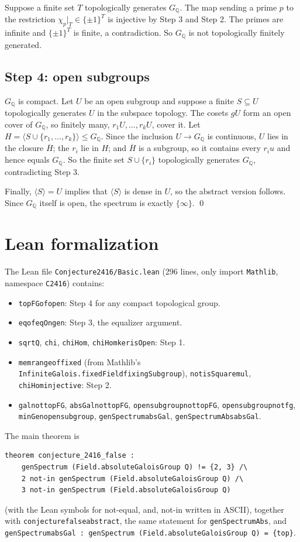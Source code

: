 \documentclass[11pt]{article}
\theoremstyle{definition}
\theoremstyle{remark}
\renewcommand{\_}{\oldus\allowbreak}
\newcommand{\GQ}{G_{\mathbb{Q}}}
\begin{document}
Suppose a finite set $T$ topologically generates $\GQ$. The map sending a prime $p$ to the restriction
$\chi_p|_T\in\{\pm1\}^T$ is injective by Step 3 and Step 2. The primes are infinite and $\{\pm1\}^T$ is finite,
a contradiction. So $\GQ$ is not topologically finitely generated.

\subsection*{Step 4: open subgroups}
$\GQ$ is compact. Let $U$ be an open subgroup and suppose a finite $S\subseteq U$ topologically generates $U$ in
the subspace topology. The cosets $gU$ form an open cover of $\GQ$, so finitely many, $r_1U,\dots,r_kU$, cover it.
Let $H=\langle S\cup\{r_1,\dots,r_k\}\rangle\le\GQ$. Since the inclusion $U\to\GQ$ is continuous, $U$ lies in the
closure $\overline H$; the $r_i$ lie in $H$; and $\overline H$ is a subgroup, so it contains every $r_iu$ and
hence equals $\GQ$. So the finite set $S\cup\{r_i\}$ topologically generates $\GQ$, contradicting Step 3.

Finally, $\langle S\rangle=U$ implies that $\langle S\rangle$ is dense in $U$, so the abstract version follows.
Since $\GQ$ itself is open, the spectrum is exactly $\{\infty\}$. \qed

\section{Lean formalization}

The Lean file \texttt{Conjecture2416/Basic.lean} (296 lines, only import \texttt{Mathlib}, namespace
\texttt{C2416}) contains:
\begin{itemize}[leftmargin=*]
\item \texttt{topFG\_of\_open}: Step 4 for any compact topological group.
\item \texttt{eq\_of\_eqOn\_gen}: Step 3, the equalizer argument.
\item \texttt{sqrtQ}, \texttt{chi}, \texttt{chiHom}, \texttt{chiHom\_ker\_isOpen}: Step 1.
\item \texttt{mem\_range\_of\_fixed} (from Mathlib's \texttt{InfiniteGalois.fixedField\_fixingSubgroup}),
  \texttt{not\_isSquare\_mul}, \texttt{chiHom\_injective}: Step 2.
\item \texttt{gal\_not\_topFG}, \texttt{absGal\_not\_topFG}, \texttt{open\_subgroup\_not\_topFG},
  \texttt{open\_subgroup\_not\_fg}, \texttt{minGen\_open\_subgroup}, \texttt{genSpectrum\_absGal},
  \texttt{genSpectrumAbs\_absGal}.
\end{itemize}
The main theorem is
\begin{verbatim}
theorem conjecture_2416_false :
    genSpectrum (Field.absoluteGaloisGroup Q) != {2, 3} /\
    2 not-in genSpectrum (Field.absoluteGaloisGroup Q) /\
    3 not-in genSpectrum (Field.absoluteGaloisGroup Q)
\end{verbatim}
(with the Lean symbols for not-equal, and, not-in written in ASCII), together with \texttt{conjecture\_2416\_false\_abstract}, the same
statement for \texttt{genSpectrumAbs}, and \texttt{genSpectrum\_absGal : genSpectrum (Field.absoluteGaloisGroup Q) = \{top\}}.
\end{document}
